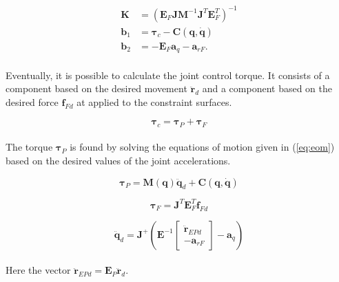 \begin{equation}
    \begin{split}
        \mathbf{K} &= (\mathbf{E}_F \mathbf{J} \mathbf{M}^{-1} \mathbf{J}^T \mathbf{E}^T_F)^{-1}\\
        \mathbf{b}_1 &= \boldsymbol{\tau}_c - \mathbf{C(q, \dot{q})}\\
        \mathbf{b}_2 &= - \mathbf{E}_F \mathbf{a}_q - \mathbf{a}_{rF}.
    \end{split}
\end{equation}
\\
Eventually, it is possible to calculate the joint control torque. It consists of a component based on the desired movement $\mathbf{\ddot{r}}_d$ and a component based on the desired force $\mathbf{f}_{Fd}$ at applied to the constraint surfaces.

\begin{equation}\label{eq:dhpfc_tau_c}
    \boldsymbol{\tau}_c = \boldsymbol{\tau}_P + \boldsymbol{\tau}_F
\end{equation}
\\
The torque $\boldsymbol{\tau}_P$ is found by solving the equations of motion given in (\ref{eq:eom}) based on the desired values of the joint accelerations.

\begin{equation}
    \boldsymbol{\tau}_P = \mathbf{M(q)} \ddot{\mathbf{q}}_d + \mathbf{C}(\mathbf{q,\dot{q}})
\end{equation}

\begin{equation}
    \boldsymbol{\tau}_F = \mathbf{J}^T \mathbf{E}^T_F \mathbf{f}_{Fd}
\end{equation}

\begin{equation}\label{eq:dhpfc_qddd}
    \ddot{\mathbf{q}}_d = \mathbf{J}^+ (\mathbf{E}^{-1} 
    \begin{bmatrix}
        \mathbf{\ddot{r}}_{EPd} \\
        - \mathbf{a}_{rF}
    \end{bmatrix}
    - \mathbf{a}_q)
\end{equation}
\\
Here the vector $\mathbf{\ddot{r}}_{EPd} = \mathbf{E}_P \mathbf{\ddot{r}}_{d}$.


